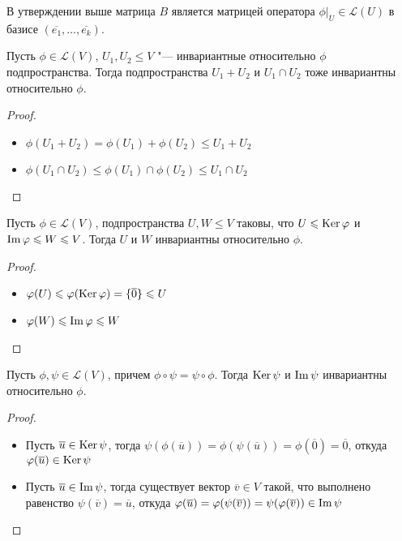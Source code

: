 \begin{note}
	В утверждении выше матрица $B$ является матрицей оператора $\phi|_U \in \mathcal{L}(U)$ в базисе $(\overline{e_1}, \dots, \overline{e_k})$.
\end{note}

\begin{proposition}
	Пусть $\phi \in \mathcal{L}(V)$, $U_1, U_2 \le V$ "--- инвариантные относительно $\phi$ подпространства. Тогда подпространства $U_1 + U_2$ и $U_1 \cap U_2$ тоже инвариантны относительно $\phi$.
\end{proposition}

\begin{proof}~
	\begin{itemize}
		\item $\phi(U_1 + U_2) = \phi(U_1) + \phi(U_2) \le U_1 + U_2$
		\item $\phi(U_1 \cap U_2) \le \phi(U_1) \cap \phi(U_2) \le U_1 \cap U_2$\qedhere
	\end{itemize}
\end{proof}

\begin{proposition}
	Пусть $\phi \in \mathcal{L}(V)$, подпространства $U, W \le V$ таковы, что $U \leqslant \operatorname{Ker}{\varphi}$ и $\operatorname{Im}{\varphi} \leqslant W \leqslant V$. Тогда $U$ и $W$ инвариантны относительно $\phi$.
\end{proposition}

\begin{proof}~
	\begin{itemize}
		\item $\varphi(U) \leqslant \varphi(\operatorname{Ker}{\varphi}) = \{\overline{0}\} \leqslant U$
		\item $\phi(W) \le \im{\phi} \hm{\le} W$\qedhere
	\end{itemize}
\end{proof}

\begin{proposition}
	Пусть $\phi, \psi \in \mathcal{L}(V)$, причем $\phi \circ \psi = \psi \circ \phi$. Тогда $\operatorname{Ker}{\psi}$ и $\operatorname{Im}{\psi}$ инвариантны относительно $\phi$.
\end{proposition}

\begin{proof}~
	\begin{itemize}
		\item Пусть $\overline{u} \in \operatorname{Ker}{\psi}$, тогда $\psi(\phi(\overline{u})) = \phi(\psi(\overline{u})) = \phi(\overline{0}) = \overline{0}$, откуда $\varphi(\overline{u}) \in \operatorname{Ker}{\psi}$
		\item Пусть $\overline{u} \in \operatorname{Im}{\psi}$, тогда существует вектор $\overline{v} \in V$ такой, что выполнено равенство $\psi(\overline{v}) = \overline{u}$, откуда $\phi(\overline{u}) = \phi(\psi(\overline{v})) \hm{=} \psi(\phi(\overline{v})) \in \im{\psi}$\qedhere
	\end{itemize}
\end{proof}


